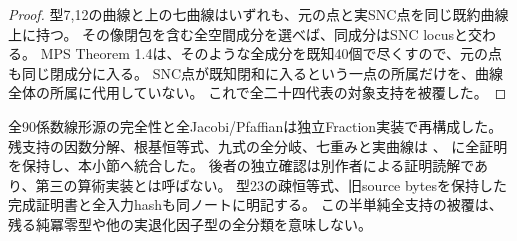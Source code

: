 \documentclass[a4paper,11pt]{ltjsarticle}
\theoremstyle{definition}
\begin{document}
\begin{proof}
型7,12の曲線と上の七曲線はいずれも、元の点と実SNC点を同じ既約曲線上に持つ。
その像閉包を含む全空間成分を選べば、同成分はSNC locusと交わる。
MPS Theorem 1.4は、そのような全成分を既知40個で尽くすので、元の点も同じ閉成分に入る。
SNC点が既知閉和に入るという一点の所属だけを、曲線全体の所属に代用していない。
これで全二十四代表の対象支持を被覆した。
\end{proof}

全90係数線形源の完全性と全Jacobi/Pfaffianは独立Fraction実装で再構成した。
残支持の因数分解、根基恒等式、九式の全分岐、七重みと実曲線は
、
に全証明を保持し、本小節へ統合した。
後者の独立確認は別作者による証明読解であり、第三の算術実装とは呼ばない。
型23の疎恒等式、旧source bytesを保持した完成証明書と全入力hashも同ノートに明記する。
この半単純全支持の被覆は、残る純冪零型や他の実退化因子型の全分類を意味しない。
\end{document}
